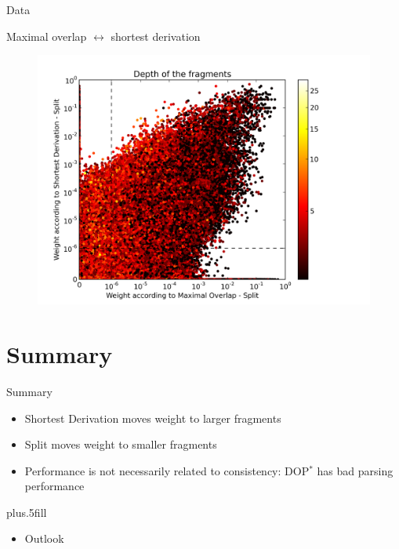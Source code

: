 \documentclass{beamer}
\newcommand{\dops}[0]{DOP$ ^*$}
\begin{document}
\begin{frame}{Data}
\begin{itemize}
\begin{frame}{Maximal overlap $\leftrightarrow$ shortest derivation}

\begin{figure}
\includegraphics[width=\textwidth,trim=0.5cm 0cm 2.5cm 0.5cm, clip=true]{../data/plots/0.png}
\end{figure}
\end{frame}




\section*{Summary}

\begin{frame}{Summary}

  \begin{itemize}
  \item
    \alert{Shortest Derivation} moves weight to larger fragments
  \item
    \alert{Split} moves weight to smaller fragments

  \item
    \alert{Performance} is not necessarily related to \alert{consistency}:   \alert{\dops{}} has bad parsing performance

  \end{itemize}
  
  \vskip0pt plus.5fill
  \begin{itemize}
  \item
    Outlook



\end{itemize}
\end{frame}
\end{itemize}
\end{frame}
\end{document}
